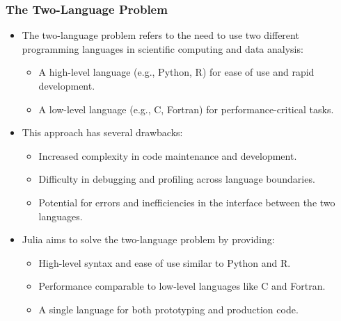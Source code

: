\documentclass[aspectratio=169]{beamer} %
\begin{document}
\begin{frame}
  \frametitle{The Two-Language Problem}
  \begin{itemize}
    \item The two-language problem refers to the need to use two different programming languages in scientific computing and data analysis:
      \begin{itemize}
        \item A high-level language (e.g., Python, R) for ease of use and rapid development.
        \item A low-level language (e.g., C, Fortran) for performance-critical tasks.
      \end{itemize}
    \item This approach has several drawbacks:
      \begin{itemize}
        \item Increased complexity in code maintenance and development.
        \item Difficulty in debugging and profiling across language boundaries.
        \item Potential for errors and inefficiencies in the interface between the two languages.
      \end{itemize}
    \item Julia aims to solve the two-language problem by providing:
      \begin{itemize}
        \item High-level syntax and ease of use similar to Python and R.
        \item Performance comparable to low-level languages like C and Fortran.
        \item A single language for both prototyping and production code.
      \end{itemize}
  \end{itemize}
\end{frame}
\end{document}

